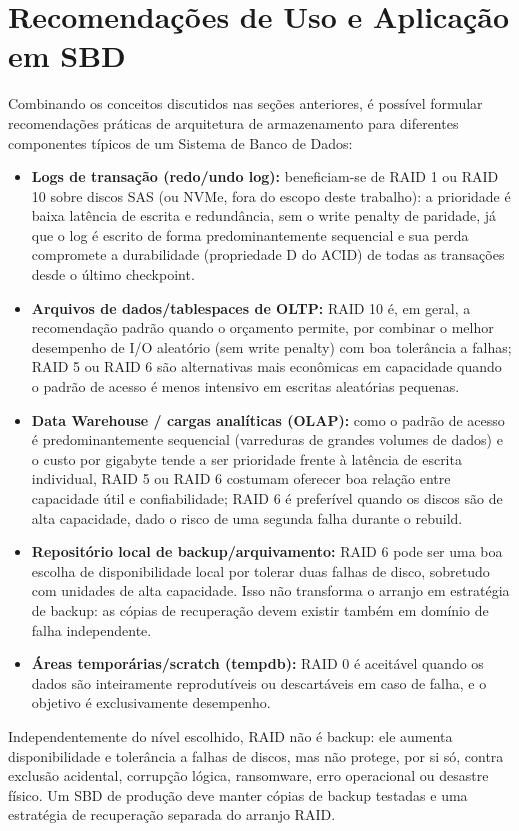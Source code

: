 \documentclass[11pt,a4paper]{article}
\begin{document}
\section{Recomendações de Uso e Aplicação em SBD}
Combinando os conceitos discutidos nas seções anteriores, é possível formular recomendações práticas de arquitetura de armazenamento para diferentes componentes típicos de um Sistema de Banco de Dados:
\begin{itemize}[leftmargin=*]
    \item \textbf{Logs de transação (redo/undo log):} beneficiam-se de RAID 1 ou RAID 10 sobre discos SAS (ou NVMe, fora do escopo deste trabalho): a prioridade é baixa latência de escrita e redundância, sem o write penalty de paridade, já que o log é escrito de forma predominantemente sequencial e sua perda compromete a durabilidade (propriedade D do ACID) de todas as transações desde o último checkpoint.
    \item \textbf{Arquivos de dados/tablespaces de OLTP:} RAID 10 é, em geral, a recomendação padrão quando o orçamento permite, por combinar o melhor desempenho de I/O aleatório (sem write penalty) com boa tolerância a falhas; RAID 5 ou RAID 6 são alternativas mais econômicas em capacidade quando o padrão de acesso é menos intensivo em escritas aleatórias pequenas.
    \item \textbf{Data Warehouse / cargas analíticas (OLAP):} como o padrão de acesso é predominantemente sequencial (varreduras de grandes volumes de dados) e o custo por gigabyte tende a ser prioridade frente à latência de escrita individual, RAID 5 ou RAID 6 costumam oferecer boa relação entre capacidade útil e confiabilidade; RAID 6 é preferível quando os discos são de alta capacidade, dado o risco de uma segunda falha durante o rebuild.
    \item \textbf{Repositório local de backup/arquivamento:} RAID 6 pode ser uma boa escolha de disponibilidade local por tolerar duas falhas de disco, sobretudo com unidades de alta capacidade. Isso não transforma o arranjo em estratégia de backup: as cópias de recuperação devem existir também em domínio de falha independente.
    \item \textbf{Áreas temporárias/scratch (tempdb):} RAID 0 é aceitável quando os dados são inteiramente reprodutíveis ou descartáveis em caso de falha, e o objetivo é exclusivamente desempenho.
\end{itemize}

Independentemente do nível escolhido, RAID não é backup: ele aumenta disponibilidade e tolerância a falhas de discos, mas não protege, por si só, contra exclusão acidental, corrupção lógica, ransomware, erro operacional ou desastre físico. Um SBD de produção deve manter cópias de backup testadas e uma estratégia de recuperação separada do arranjo RAID.
\end{document}
